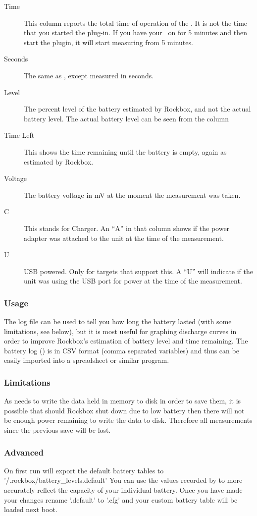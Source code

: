 \begin{description}
\item[Time] This column reports the total time of operation of the \dap. It is 
not the time that you started the plug-in. If you have your \dap\ on for 5 
minutes and then start the plugin, it will start measuring from 5 minutes.
\item[Seconds] The same as , except measured in seconds.
\item[Level] The percent level of the battery estimated by Rockbox, and not the
actual battery level. The actual battery level can be seen from the
 column
\item[Time Left] This shows the time remaining until the battery is empty,
again as estimated by Rockbox.
\item[Voltage] The battery voltage in mV at the moment the measurement
was taken.
\item[C] This stands for Charger. An ``A'' in that column shows if the power
adapter was attached to the unit at the time of the measurement.
\item[U] USB powered. Only for targets that support this. A ``U'' will indicate
if the unit was using the USB port for power at the time of the measurement. 
\end{description}

\subsubsection{Usage}
The log file can be used to tell you how long the battery lasted (with some
limitations, see below), but it is most useful for graphing discharge curves
in order to improve Rockbox's estimation of battery level and time remaining.
The battery log () is in CSV format
(comma separated variables) and thus can be easily imported into a spreadsheet
or similar program.

\subsubsection{Limitations}
As  needs to write the data held in memory to
disk in order to save them, it is possible that should Rockbox shut down
due to low battery then there will not be enough power remaining to write the
data to disk. Therefore all measurements since the previous save will be lost.

\subsubsection{Advanced}
On first run  will export the default battery tables
to '/.rockbox/battery\_levels.default'
You can use the values recorded by 
to more accurately reflect the capacity of your individual battery.
Once you have made your changes rename '.default' to '.cfg' and your custom
battery table will be loaded next boot.

